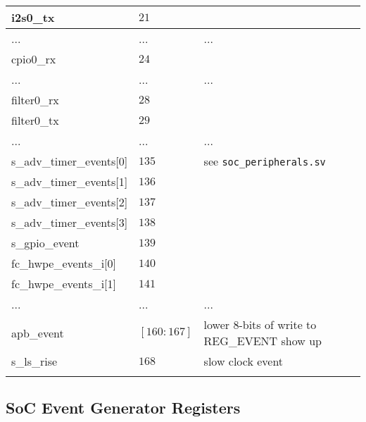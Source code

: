 {\begin{tabularx}{\textwidth}{|l|l|X|}
  \hline
  i2s0\_tx                & $21$             &               \\
  \hline
  ...                     & ...              & ...           \\
  \hline
  cpio0\_rx               & $24$             &               \\
  \hline
  ...                     & ...              & ...           \\
  \hline
  filter0\_rx             & $28$             &               \\
  \hline
  filter0\_tx             & $29$             &               \\
  \hline
  ...                     & ...              & ...           \\
  \hline
  s\_adv\_timer\_events[0]& $135$            & see \texttt{soc\_peripherals.sv} \\
  \hline
  s\_adv\_timer\_events[1]& $136$            &               \\
  \hline
  s\_adv\_timer\_events[2]& $137$            &               \\
  \hline
  s\_adv\_timer\_events[3]& $138$            &               \\
  \hline
  s\_gpio\_event          & $139$            &               \\
  \hline
  fc\_hwpe\_events\_i[0]  & $140$            &               \\
  \hline
  fc\_hwpe\_events\_i[1]  & $141$            &               \\
  \hline
  ...                     & ...              & ...           \\
  \hline
  apb\_event              & $[160:167]$      & lower 8-bits of write to REG\_EVENT show up \\
  \hline
  s\_ls\_rise             & $168$            & slow clock event \\

  \hline
  \caption{SoC Event ID assignment}
\end{tabularx}
}
\subsection{SoC Event Generator Registers}


